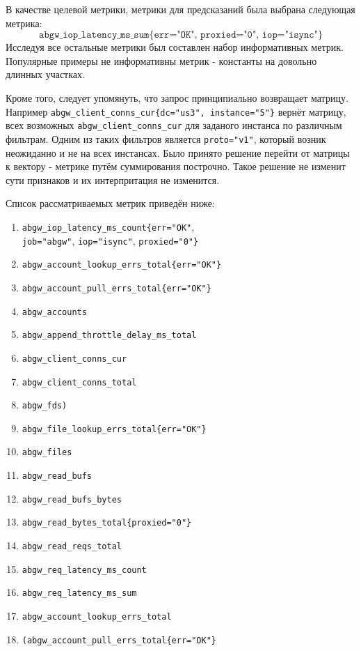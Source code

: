 \documentclass[14pt, a4paper]{extarticle}
\begin{document}
	В качестве целевой метрики, метрики для предсказаний была выбрана следующая метрика:
	\begin{equation}
		 \texttt{abgw\_iop\_latency\_ms\_sum\{err="OK", proxied="0", iop="isync"\}}\label{target_metric}
	 \end{equation}
	 Исследуя все остальные метрики был составлен набор информативных метрик.
	 Популярные примеры не информативны метрик - константы на довольно длинных участках. 
	 
	 Кроме того, следует упомянуть, что запрос принципиально возвращает матрицу.
	 Например \texttt{abgw\_client\_conns\_cur\{dc="us3", instance="5"\}} вернёт матрицу, всех возможных \texttt{abgw\_client\_conns\_cur} для заданого инстанса по различным фильтрам. 
	 Одним из таких фильтров является \texttt{proto="v1"}, который возник неожиданно и не на всех инстансах.
	 Было принято решение перейти от матрицы к вектору - метрике путём суммирования построчно. Такое решение не изменит сути признаков и их интерпритация не изменится.
	 
	Список рассматриваемых метрик приведён ниже:
	 \begin{enumerate}
	 	\item \texttt{abgw\_iop\_latency\_ms\_count\{err="OK"}, \\
	 	\texttt{job="abgw"}, \texttt{iop="isync"}, \texttt{proxied="0"\}}
	 	\item \texttt{abgw\_account\_lookup\_errs\_total\{err="OK"\}}
	 	\item \texttt{abgw\_account\_pull\_errs\_total\{err="OK"\}}
	 	\item \texttt{abgw\_accounts}
	 	\item \texttt{abgw\_append\_throttle\_delay\_ms\_total}
	 	\item \texttt{abgw\_client\_conns\_cur}
	 	\item \texttt{abgw\_client\_conns\_total}
	 	\item \texttt{abgw\_fds)}
	 	\item \texttt{abgw\_file\_lookup\_errs\_total\{err="OK"\}}
	 	\item \texttt{abgw\_files}
	 	\item \texttt{abgw\_read\_bufs}
	 	\item \texttt{abgw\_read\_bufs\_bytes}	
	 	\item \texttt{abgw\_read\_bytes\_total\{proxied="0"\}}
	 	\item \texttt{abgw\_read\_reqs\_total}
	 	\item \texttt{abgw\_req\_latency\_ms\_count}
	 	\item \texttt{abgw\_req\_latency\_ms\_sum}
	 	\item \texttt{abgw\_account\_lookup\_errs\_total}
	 	\item \texttt{(abgw\_account\_pull\_errs\_total\{err="OK"\}}
	 \end{enumerate}\label{list_of_metrics}
\end{document}
